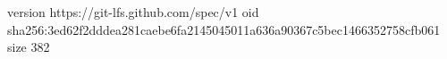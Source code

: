 version https://git-lfs.github.com/spec/v1
oid sha256:3ed62f2dddea281caebe6fa2145045011a636a90367c5bec1466352758cfb061
size 382
